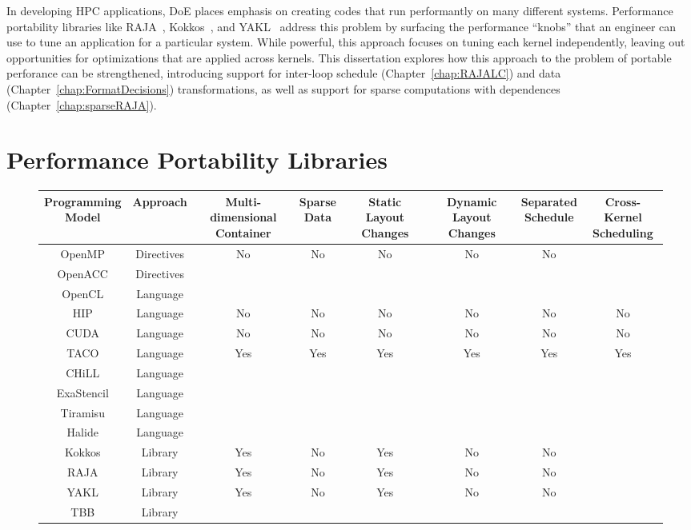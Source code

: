 In developing HPC applications, DoE places emphasis on creating codes that run performantly on many different systems.
Performance portability libraries like RAJA~\cite{hornung2014RAJA}, Kokkos~\cite{edwards2014kokkos}, and YAKL~\cite{yakl} address this problem by surfacing the performance ``knobs'' that an engineer can use to tune an application for a particular system. 
While powerful, this approach focuses on tuning each kernel independently, leaving out opportunities for optimizations that are applied across kernels.
This dissertation explores how this approach to the problem of portable perforance can be strengthened, introducing support for inter-loop schedule (Chapter~\ref{chap:RAJALC}) and data (Chapter~\ref{chap:FormatDecisions}) transformations, as well as support for sparse computations with dependences (Chapter~\ref{chap:sparseRAJA}).

\section{Performance Portability Libraries}
\begin{figure}
\begin{tabular*}{7in}[h]{|c|c | c c c c | c c |}
\hline
\makecell{Programming \\ Model} & Approach & \makecell{Multi-dimensional \\ Container} & \makecell{Sparse \\ Data} & \makecell{Static \\ Layout Changes} & \makecell{Dynamic \\ Layout Changes} & \makecell{Separated \\ Schedule} & \makecell{Cross-Kernel \\ Scheduling} \\ \hline
OpenMP & Directives & No & No & No & No & No\\
OpenACC & Directives \\
OpenCL & Language \\
HIP & Language & No & No & No & No & No & No \\
CUDA & Language & No & No & No & No & No & No \\
TACO & Language & Yes & Yes & Yes & Yes & Yes & Yes\\
CHiLL & Language \\
ExaStencil & Language \\
Tiramisu & Language \\
Halide & Language \\
Kokkos & Library & Yes & No & Yes & No & No\\
RAJA & Library & Yes & No & Yes & No & No\\
YAKL & Library & Yes & No & Yes & No & No\\
TBB & Library \\
\hline
\end{tabular*}
\end{figure}

